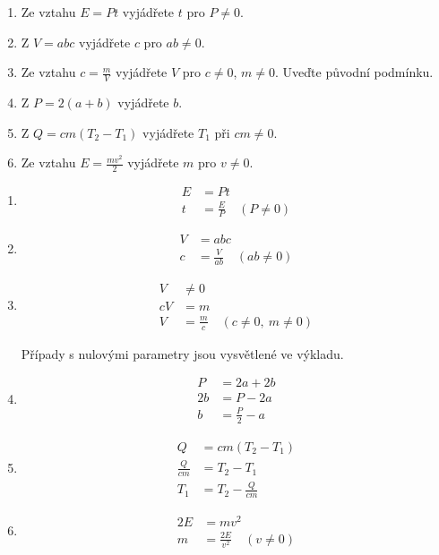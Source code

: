 \documentclass[11pt,a4paper]{article}
\begin{document}
\begin{zadaniReseniBox}[title={Domácí úkol}]
\begin{enumerate}[label=\alph*),itemsep=0pt,topsep=0pt]
\item Ze vztahu $E=Pt$ vyjádřete $t$ pro $P\ne0$.
\item Z $V=abc$ vyjádřete $c$ pro $ab\ne0$.
\item Ze vztahu $c=\frac mV$ vyjádřete $V$ pro $c\ne0$, $m\ne0$. Uveďte původní podmínku.
\item Z $P=2(a+b)$ vyjádřete $b$.
\item Z $Q=cm(T_2-T_1)$ vyjádřete $T_1$ při $cm\ne0$.
\item Ze vztahu $E=\frac{mv^2}{2}$ vyjádřete $m$ pro $v\ne0$.
\end{enumerate}
\tcblower
\begin{enumerate}[label=\alph*),itemsep=0pt,topsep=0pt]
\item
\[\begin{aligned}
E&=Pt \\
t&=\frac EP\quad(P\ne0)
\end{aligned}\]
\item
\[\begin{aligned}
V&=abc \\
c&=\frac V{ab}\quad(ab\ne0)
\end{aligned}\]
\item
\[\begin{aligned}
V&\ne0 \\
cV&=m \\
V&=\frac mc\quad(c\ne0,\ m\ne0)
\end{aligned}\]\par Případy s nulovými parametry jsou vysvětlené ve výkladu.
\item
\[\begin{aligned}
P&=2a+2b \\
2b&=P-2a \\
b&=\frac P2-a
\end{aligned}\]
\item
\[\begin{aligned}
Q&=cm(T_2-T_1) \\
\frac Q{cm}&=T_2-T_1 \\
T_1&=T_2-\frac Q{cm}
\end{aligned}\]
\item
\[\begin{aligned}
2E&=mv^2 \\
m&=\frac{2E}{v^2}\quad(v\ne0)
\end{aligned}\]
\end{enumerate}
\end{zadaniReseniBox}
\endgroup
{}
\end{document}

